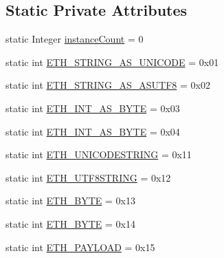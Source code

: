 \subsection*{Static Private Attributes}
\begin{DoxyCompactItemize}
\item 
static Integer \mbox{\hyperlink{classcom_1_1ethernom_1_1android_1_1etherapi_1_1_ether_a_p_i_manager_a07fd618749bd7565b993878a314c8c65}{instance\+Count}} = 0
\item 
static int \mbox{\hyperlink{classcom_1_1ethernom_1_1android_1_1etherapi_1_1_ether_a_p_i_manager_a3a692abdb80ee9086ec1cbaf323220d1}{E\+T\+H\+\_\+\+S\+T\+R\+I\+N\+G\+\_\+\+A\+S\+\_\+\+U\+N\+I\+C\+O\+DE}} = 0x01
\item 
static int \mbox{\hyperlink{classcom_1_1ethernom_1_1android_1_1etherapi_1_1_ether_a_p_i_manager_a2acb4ad48275de1fdee195acf970ce71}{E\+T\+H\+\_\+\+S\+T\+R\+I\+N\+G\+\_\+\+A\+S\+\_\+\+A\+S\+U\+T\+F8}} = 0x02
\item 
static int \mbox{\hyperlink{classcom_1_1ethernom_1_1android_1_1etherapi_1_1_ether_a_p_i_manager_a33cfa7325aa0e0a7161b552358ce4e15}{E\+T\+H\+\_\+\+I\+N\+T\+\_\+\+A\+S\+\_\+\+B\+Y\+TE}} = 0x03
\item 
static int \mbox{\hyperlink{classcom_1_1ethernom_1_1android_1_1etherapi_1_1_ether_a_p_i_manager_a86b203bf9bd00748aa1de01be5f228f1}{E\+T\+H\+\_\+\+I\+N\+T\+\_\+\+A\+S\+\_\+B\+Y\+TE}} = 0x04
\item 
static int \mbox{\hyperlink{classcom_1_1ethernom_1_1android_1_1etherapi_1_1_ether_a_p_i_manager_ad0ee25f902a56f820887c8657ccaa1f3}{E\+T\+H\+\_\+\+U\+N\+I\+C\+O\+D\+E\+S\+T\+R\+I\+NG}} = 0x11
\item 
static int \mbox{\hyperlink{classcom_1_1ethernom_1_1android_1_1etherapi_1_1_ether_a_p_i_manager_a468450784f1c0005a73a9fbadfa7abb5}{E\+T\+H\+\_\+\+U\+T\+F8\+S\+T\+R\+I\+NG}} = 0x12
\item 
static int \mbox{\hyperlink{classcom_1_1ethernom_1_1android_1_1etherapi_1_1_ether_a_p_i_manager_a72425bc77b8427a0641732cdbca72280}{E\+T\+H\+\_\+\+B\+Y\+TE}} = 0x13
\item 
static int \mbox{\hyperlink{classcom_1_1ethernom_1_1android_1_1etherapi_1_1_ether_a_p_i_manager_aa1d1a88aaaabfbb1d1ab96434eccef37}{E\+T\+H\+\_\+B\+Y\+TE}} = 0x14
\item 
static int \mbox{\hyperlink{classcom_1_1ethernom_1_1android_1_1etherapi_1_1_ether_a_p_i_manager_a9f63dbb00a11c7c759a3b6a0948d224a}{E\+T\+H\+\_\+\+P\+A\+Y\+L\+O\+AD}} = 0x15
\end{DoxyCompactItemize}


